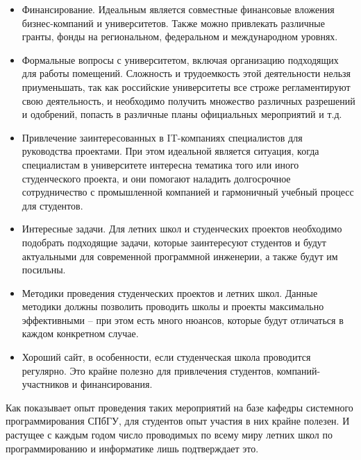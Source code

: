 \documentclass[a5paper]{article}
\begin{document}
\begin{itemize}
 \item Финансирование. Идеальным является совместные финансовые вложения бизнес-компаний и университетов. Также можно привлекать различные гранты, фонды на региональном, федеральном и международном уровнях. 
 \item Формальные вопросы с университетом, включая организацию подходящих для работы помещений. Сложность и трудоемкость этой деятельности нельзя приуменьшать, так как российские университеты все строже регламентируют свою деятельность, и необходимо получить множество различных разрешений и одобрений, попасть в различные планы официальных мероприятий и т.д. 
 \item Привлечение заинтересованных в IT-компаниях специалистов для руководства проектами. При  этом идеальной является ситуация, когда специалистам в университете интересна тематика того или иного студенческого проекта, и они помогают наладить долгосрочное сотрудничество с промышленной компанией и гармоничный учебный процесс для студентов.  
 \item Интересные задачи. Для летних школ и студенческих проектов необходимо подобрать подходящие задачи, которые заинтересуют студентов и будут актуальными для современной программной инженерии, а также будут им посильны. 
 \item Методики проведения студенческих проектов и летних школ. Данные методики должны  позволить проводить школы и проекты максимально эффективными -- при этом есть много нюансов, которые будут отличаться в каждом конкретном случае.  
 \item Хороший сайт, в особенности, если студенческая школа проводится регулярно. Это крайне полезно для привлечения студентов, компаний-участников и финансирования. 
\end{itemize}
  
Как показывает опыт проведения таких мероприятий на базе кафедры системного программирования СПбГУ, для студентов опыт участия в них крайне полезен. И растущее с каждым годом число проводимых по всему миру летних школ по программированию и информатике лишь подтверждает это.
\end{document}
